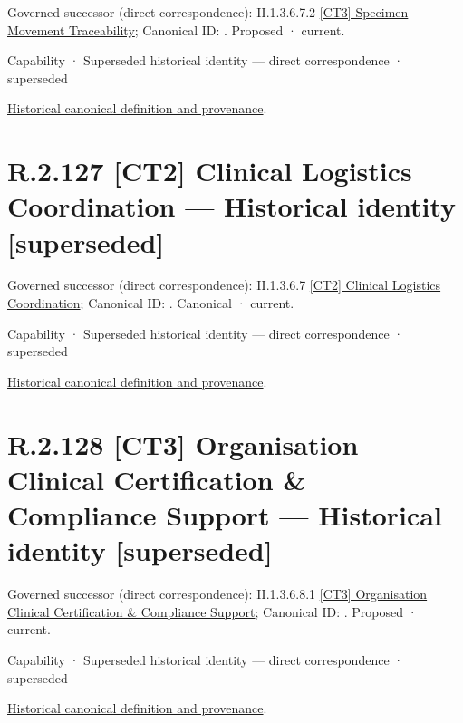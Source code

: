 {\small Governed successor (direct correspondence): II.1.3.6.7.2 \hyperref[element:bfa2e9a84ddd4287897573dc0d917a00]{[CT3] Specimen Movement Traceability}; Canonical ID: \texttt{}. Proposed · current.}\par
\label{element:129119d7b2744ffd805c58f25557fa27}
{\small Capability · Superseded historical identity — direct correspondence · superseded}\par
\href{../../../../../../../continuum/strategy/capability/129119d7b2744ffd805c58f25557fa27.md}{Historical canonical definition and provenance}.\par
\section*{R.2.127 [CT2] Clinical Logistics Coordination — Historical identity [superseded]}
\label{navigation:R.2.127}

{\small Governed successor (direct correspondence): II.1.3.6.7 \hyperref[element:0c27be11b4a44cb19e992309b8146a17]{[CT2] Clinical Logistics Coordination}; Canonical ID: \texttt{}. Canonical · current.}\par
\label{element:90a782ff2d004fa984ae0465528b2253}
{\small Capability · Superseded historical identity — direct correspondence · superseded}\par
\href{../../../../../../../continuum/strategy/capability/90a782ff2d004fa984ae0465528b2253.md}{Historical canonical definition and provenance}.\par
\section*{R.2.128 [CT3] Organisation Clinical Certification \& Compliance Support — Historical identity [superseded]}
\label{navigation:R.2.128}

{\small Governed successor (direct correspondence): II.1.3.6.8.1 \hyperref[element:4de624e7bf49472f91e3e5c734ee8725]{[CT3] Organisation Clinical Certification \& Compliance Support}; Canonical ID: \texttt{}. Proposed · current.}\par
\label{element:cee76a930a4e4e7d9c49357ba290c8bf}
{\small Capability · Superseded historical identity — direct correspondence · superseded}\par
\href{../../../../../../../continuum/strategy/capability/cee76a930a4e4e7d9c49357ba290c8bf.md}{Historical canonical definition and provenance}.\par
